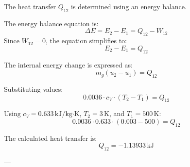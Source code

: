 The heat transfer \( Q_{12} \) is determined using an energy balance.  

The energy balance equation is:  
\[
\Delta E = E_2 - E_1 = Q_{12} - W_{12}
\]  
Since \( W_{12} = 0 \), the equation simplifies to:  
\[
E_2 - E_1 = Q_{12}
\]  

The internal energy change is expressed as:  
\[
m_g (u_2 - u_1) = Q_{12}
\]  

Substituting values:  
\[
0.0036 \cdot c_V \cdot (T_2 - T_1) = Q_{12}
\]  

Using \( c_V = 0.633 \, \text{kJ/kg·K} \), \( T_2 = 3 \, \text{K} \), and \( T_1 = 500 \, \text{K} \):  
\[
0.0036 \cdot 0.633 \cdot (0.003 - 500) = Q_{12}
\]  

The calculated heat transfer is:  
\[
Q_{12} = -1.13933 \, \text{kJ}
\]  

---